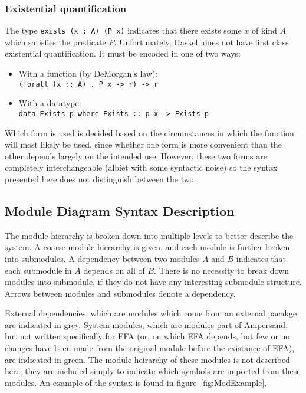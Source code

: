 \documentclass[12pt, svgnames]{article}
\let\Oldsubsection\subsection
\renewcommand{\subsection}{\FloatBarrier\Oldsubsection}
\let\Oldsubsubsection\subsubsection
\renewcommand{\subsubsection}{\FloatBarrier\Oldsubsubsection}
\begin{document}
\subsubsection*{Existential quantification}
The type \lstinline!exists (x : A) (P x)! indicates that there exists some $x$
of kind $A$ which satisfies the predicate $P$. Unfortunately, Haskell does not
have first class existential quantification. It must be encoded in one of
two ways:

\begin{itemize}
\item With a function (by DeMorgan's law): \\ \texttt{(forall (x :: A) . P x -> r) -> r}
\item With a datatype: \\ \texttt{data Exists p where Exists :: p x -> Exists p}
\end{itemize} 

Which form is used is decided based on the circumstances in which the function
will most likely be used, since whether one form is more convenient than the
other depends largely on the intended use. However, these two forms are
completely interchangeable (albiet with some syntactic noise) so the syntax
presented here does not distinguish between the two. 

\subsection{Module Diagram Syntax Description}\label{subsec:ModuleSyntax}

The module hierarchy is broken down into multiple levels to better describe the
system.  A coarse module hierarchy is given, and each module is further broken
into submodules.  A dependency between two modules $A$ and $B$ indicates that
each submodule in $A$ depends on all of $B$. There is no necessity to break
down modules into submodule, if they do not have any interesting submodule 
structure. Arrows between modules and submodules denote a dependency. 

External dependencies, which are modules which come from an external pacakge,
are indicated in {\color{grey}grey}. System modules, which are modules part of
Ampersand, but not written specifically for EFA (or, on which EFA depends, but
few or no changes have been made from the original module before the existance
of EFA), are indicated in {\color{applegreen}green}. The module heirarchy of
these modules is not described here; they are included simply to indicate which
symbols are imported from these modules. An example of the syntax is found in
figure~\ref{fig:ModExample}.
\end{document}
